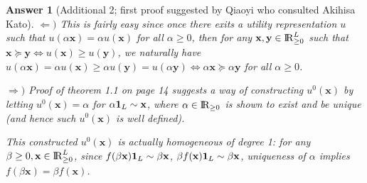 \documentclass{article}
\newtheorem*{ans}{Answer}
\newcommand {\Reals}  {{\rm I \! R}}
\newcommand{\1}{{\bf 1}}
\newcommand{\0}{{\mathbf{0}}}
\newcommand{\x}{{\mathbf{x}}}
\newcommand{\y}{{\mathbf{y}}}
\newcommand{\<}{\langle}
\renewcommand{\>}{\rangle}
\begin{document}
\begin{ans}[Additional 2; first proof suggested by Qiaoyi who consulted Akihisa Kato] 	$\Leftarrow)$ This is fairly easy since once there exits a utility representation $u$ such that $u(\alpha \x) = \alpha u(\x)$ for all $\alpha \ge 0$, then for any $\x, \y \in \Reals_{\ge 0}^L$ such that $\x \succeq \y \Leftrightarrow u(\x) \ge u(\y) $, we naturally have $u(\alpha \x) = \alpha u(\x) \ge \alpha u(\y) =  u( \alpha \y)  \Leftrightarrow \alpha \x \succeq \alpha \y$ for all $\alpha \ge 0$.
	
	
	$\Rightarrow )$ Proof of theorem 1.1 on page 14 suggests a way of constructing $u^0(\x)$ by letting $u^0(\x) = \alpha$ for $\alpha \1_L \sim \x$, where $\alpha \in \Reals_{\ge 0}$ is shown to exist and be unique (and hence such $u^0(\x)$ is well defined).
	
	This constructed $u^0(\x)$ is actually homogeneous of degree 1: for any $\beta \ge 0, \x \in \Reals_{\ge 0 }^L$, since $f(\beta \x ) \1_L  \sim \beta \x $, $\beta f( \x ) \1_L  \sim \beta \x$, uniqueness of $\alpha$ implies $ f(\beta \x )  =  \beta f( \x )$.
\end{ans}
\end{document}
